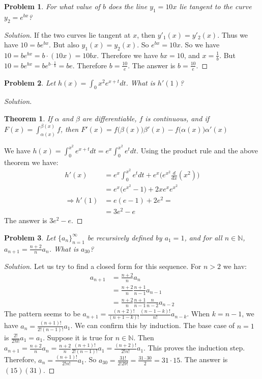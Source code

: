 \documentclass[12pt,oneside]{book}
\theoremstyle{mystyle}
\newtheorem{problem}{Problem}[section]
\newtheorem*{theorem*}{Theorem}
\begin{document}
\begin{problem}
For what value of $b$ does the line $y_1=10x$ lie tangent to the curve $y_2=e^{bx}$?
\end{problem}
\begin{proof}[Solution]
If the two curves lie tangent at $x$, then $y'_1(x) = y'_2(x)$. Thus we have $10 = be^{bx}$. But also $y_1(x) = y_2(x)$. So $e^{bx} = 10x$. So we have $10 = be^{bx} = b\cdot (10x) = 10bx$. Therefore we have $bx = 10$, and $x = \frac{1}{b}$. But $10 = b e^{bx} = b e^{b\cdot \frac{1}{b}} = be$. Therefore $b = \frac{10}{e}$. The answer is $b = \frac{10}{e}$.
\end{proof}

\begin{problem}
Let $h(x) = \int_{0}{x^2}e^{x+t}dt$. What is $h'(1)$?
\end{problem}
\begin{proof}[Solution]
\begin{theorem*}
If $\alpha$ and $\beta$ are differentiable, $f$ is continuous, and if $F(x) = \int_{\alpha(x)}^{\beta(x)}f$, then $F'(x) = f\big(\beta(x)\big)\beta'(x) - f\big(\alpha(x)\big)\alpha'(x)$
\end{theorem*}
We have $h(x) = \int_{0}^{x^2}e^{x+t}dt = e^x \int_{0}^{x^2}e^t dt$. Using the product rule and the above theorem we have:
\begin{align}
\nonumber h'(x) &= e^x \int_{0}^{x^2} e^t dt + e^{x} \big(e^{x^2}\frac{d}{dx}(x^2)\big) \\
\nonumber &= e^x\big(e^{x^2}-1\big) + 2xe^xe^{x^2} \\
\nonumber \Rightarrow h'(1) &= e(e-1) + 2e^2 = \\
\nonumber &= 3e^2 - e
\end{align}
The answer is $3e^2 - e$.
\end{proof}

\begin{problem}
Let $\{a_n\}_{n=1}^{\infty}$ be recursively defined by $a_1 = 1$, and for all $n\in \mathbb{N}$, $a_{n+1} = \frac{n+2}{n}a_n$. What is $a_{30}$?
\end{problem}
\begin{proof}[Solution]
Let us try to find a closed form for this sequence. For $n>2$ we hav:
\begin{align}
\nonumber a_{n+1} &= \frac{n+2}{n}a_n \\
\nonumber &= \frac{n+2}{n}\frac{n+1}{n-1}a_{n-1}\\
\nonumber &= \frac{n+2}{n}\frac{n+1}{n-1}\frac{n}{n-2}a_{n-2}
\end{align}
The pattern seems to be $a_{n+1} = \frac{(n+2)!}{(n+1-k)!}\frac{(n-1-k)!}{n!}a_{n-k}$. When $k=n-1$, we have $a_{n} = \frac{(n+1)!}{2!(n-1)!}a_1$. We can confirm this by induction. The base case of $n=1$ is $\frac{2!}{2!0!}a_1 = a_1$. Suppose it is true for $n\in \mathbb{N}$. Then $a_{n+1} = \frac{n+2}{n} a_n = \frac{n+2}{n} \frac{(n+1)!}{2!(n-1)!}a_1 = \frac{(n+2)!}{2!n!}a_1$. This proves the induction step. Therefore, $a_n = \frac{(n+1)!}{2!n!}a_1$. So $a_{30} = \frac{31!}{2!29!} = \frac{31\cdot 30}{2} = 31\cdot 15$. The answer is $(15)(31)$.
\end{proof}
%
\end{document}
